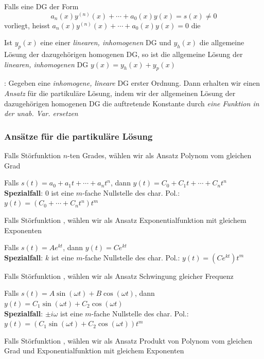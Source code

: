 \Def Falls eine DG der Form
$$a_n(x)y^{(n)}(x) + \cdots + a_0(x)y(x) = s(x) \ne 0$$
vorliegt, heisst $a_n(x)y^{(n)}(x) + \cdots + a_0(x)y(x) = 0$ die 

\Satz Ist $y_p(x)$ eine  einer \textit{linearen, inhomogenen} DG und
$y_h(x)$ die allgemeine Lösung der dazugehörigen homogenen DG, so ist die allgemeine Lösung der
\textit{linearen, inhomogenen} DG $y(x) = y_h(x) + y_p(x)$

\Satz {}: Gegeben eine \textit{inhomogene, lineare} DG erster Ordnung.
Dann erhalten wir einen \textit{Ansatz} für die partikuläre Lösung, indem wir der allgemeinen
Lösung der dazugehörigen homogenen DG die auftretende Konstante durch
\textit{eine Funktion in der unab. Var. ersetzen}

\subsubsection{Ansätze für die partikuläre Lösung}

Falls Störfunktion  $n$-ten Grades, wählen wir als Ansatz Polynom vom gleichen Grad

\Satz Falls $s(t) = a_0 + a_1 t + \cdots + a_nt^n$, dann $y(t) = C_0 + C_1 t + \cdots + C_nt^n$ \\
\textbf{Spezialfall}: $0$ ist eine $m$-fache Nullstelle des char. Pol.: $y(t) = (C_0 + \cdots + C_nt^n)t^m$

Falls Störfunktion , wählen wir als Ansatz Exponentialfunktion mit gleichem Exponenten

\Satz Falls $s(t) = A e^{kt}$, dann $y(t) = C e^{kt}$ \\
\textbf{Spezialfall}: $k$ ist eine $m$-fache Nullstelle des char. Pol.: $y(t) = (C e^{kt})t^m$

Falls Störfunktion , wählen wir als Ansatz Schwingung gleicher Frequenz

\Satz Falls $s(t) = A \sin(\omega t) + B \cos(\omega t)$, dann $y(t) = C_1 \sin(\omega t) + C_2 \cos(\omega t)$ \\
\textbf{Spezialfall}: $\pm i\omega$ ist eine $m$-fache Nullstelle des char. Pol.: $y(t) = (C_1 \sin(\omega t) + C_2 \cos(\omega t))t^m$

Falls Störfunktion , wählen wir als
Ansatz Produkt von Polynom vom gleichen Grad und Exponentialfunktion mit gleichem Exponenten
